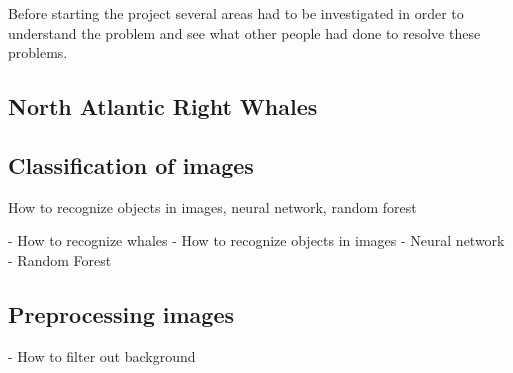 Before starting the project several areas had to be investigated in order to understand the problem and see what other people had done to resolve these problems.

\subsection{North Atlantic Right Whales}

\subsection{Classification of images}
How to recognize objects in images, neural network, random forest

- How to recognize whales
- How to recognize objects in images
	- Neural network
	- Random Forest

\subsection{Preprocessing images}

- How to filter out background